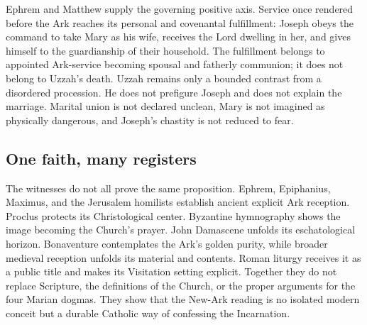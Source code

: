 Ephrem and Matthew supply the governing positive axis. Service once rendered
before the Ark reaches its personal and covenantal fulfillment: Joseph obeys
the command to take Mary as his wife, receives the Lord dwelling in her, and
gives himself to the guardianship of their household. The fulfillment belongs
to appointed Ark-service becoming spousal and fatherly communion; it does not
belong to Uzzah's death. Uzzah remains only a bounded contrast from a
disordered procession. He does not prefigure Joseph and does not explain the
marriage. Marital union is not declared unclean, Mary is not imagined as
physically dangerous, and Joseph's chastity is not reduced to fear.


\subsection{One faith, many registers}

The witnesses do not all prove the same proposition. Ephrem, Epiphanius,
Maximus, and the Jerusalem homilists establish ancient explicit Ark reception.
Proclus protects its Christological center. Byzantine hymnography shows the
image becoming the Church's prayer. John Damascene unfolds its eschatological horizon.
Bonaventure contemplates the Ark's golden purity, while broader medieval
reception unfolds its material and contents. Roman liturgy receives it
as a public title and makes its Visitation setting explicit. Together they do
not replace Scripture, the definitions of the Church, or the proper arguments
for the four Marian dogmas. They show that the New-Ark reading is no isolated
modern conceit but a durable Catholic way of confessing the Incarnation.


